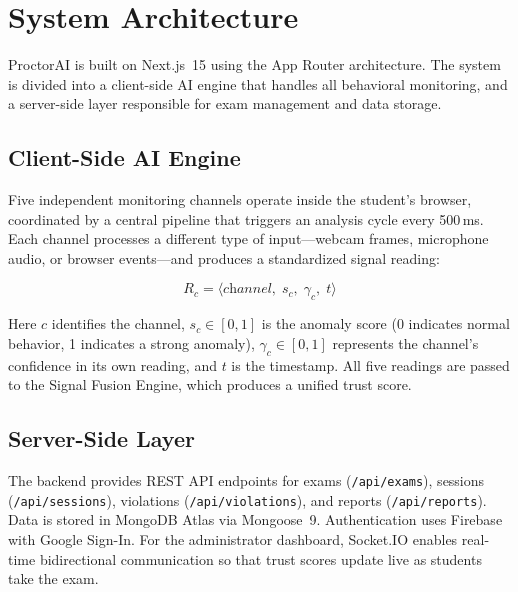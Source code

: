 \documentclass[conference]{IEEEtran}
\begin{document}
\section{System Architecture}

ProctorAI is built on Next.js~15 using the App Router architecture. The system is divided into a client-side AI engine that handles all behavioral monitoring, and a server-side layer responsible for exam management and data storage.

\subsection{Client-Side AI Engine}

Five independent monitoring channels operate inside the student's browser, coordinated by a central pipeline that triggers an analysis cycle every 500\,ms. Each channel processes a different type of input---webcam frames, microphone audio, or browser events---and produces a standardized signal reading:

\begin{equation}
    R_c = \langle \textit{channel}, \; s_c, \; \gamma_c, \; t \rangle
\end{equation}

Here $c$ identifies the channel, $s_c \in [0,1]$ is the anomaly score (0 indicates normal behavior, 1 indicates a strong anomaly), $\gamma_c \in [0,1]$ represents the channel's confidence in its own reading, and $t$ is the timestamp. All five readings are passed to the Signal Fusion Engine, which produces a unified trust score.


\subsection{Server-Side Layer}

The backend provides REST API endpoints for exams (\texttt{/api/exams}), sessions (\texttt{/api/sessions}), violations (\texttt{/api/violations}), and reports (\texttt{/api/reports}). Data is stored in MongoDB Atlas via Mongoose~9. Authentication uses Firebase with Google Sign-In. For the administrator dashboard, Socket.IO enables real-time bidirectional communication so that trust scores update live as students take the exam.
\end{document}
